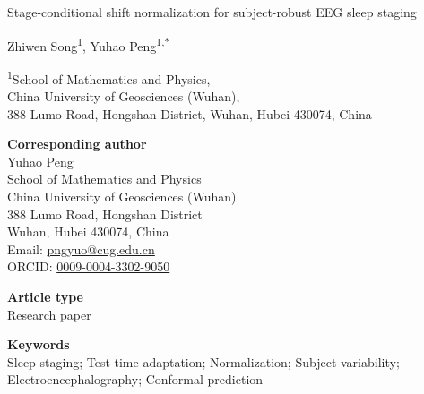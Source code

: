 \documentclass[12pt]{article}
\begin{document}
\pagestyle{empty}

\begin{center}
{\LARGE\bfseries
\parbox{0.96\textwidth}{\centering Stage-conditional shift normalization for subject-robust EEG sleep staging}\par}
\vspace{2.5em}
{\large Zhiwen Song\textsuperscript{1}, Yuhao Peng\textsuperscript{1,*}\par}
\vspace{1.25em}
{\small
\textsuperscript{1}School of Mathematics and Physics,\\
China University of Geosciences (Wuhan),\\
388 Lumo Road, Hongshan District, Wuhan, Hubei 430074, China\par}
\end{center}

\vspace{3em}
\noindent\textbf{Corresponding author}\\
Yuhao Peng\\
School of Mathematics and Physics\\
China University of Geosciences (Wuhan)\\
388 Lumo Road, Hongshan District\\
Wuhan, Hubei 430074, China\\
Email: \href{mailto:pngyuo@cug.edu.cn}{pngyuo@cug.edu.cn}\\
ORCID: \href{https://orcid.org/0009-0004-3302-9050}{0009-0004-3302-9050}

\vspace{2em}
\noindent\textbf{Article type}\\
Research paper

\vspace{2em}
\noindent\textbf{Keywords}\\
Sleep staging; Test-time adaptation; Normalization; Subject variability; Electroencephalography; Conformal prediction
\end{document}
